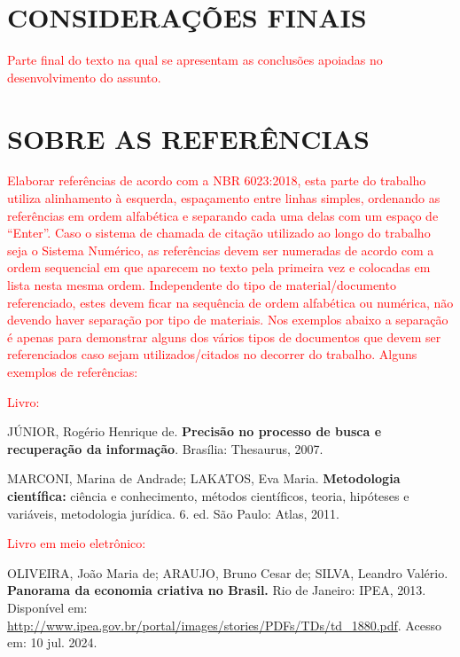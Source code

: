 \documentclass[
	12pt,				%
	openright,			%
	oneside,			%
	a4paper,			%
	english,			%
	french,				%
	spanish,			%
	brazil				%
	]{abntex2UFMT}
\begin{document}
\chapter{CONSIDERAÇÕES FINAIS}\label{CONSIDERAÇÕES}
\textcolor{red}{Parte final do texto na qual se apresentam as conclusões apoiadas no desenvolvimento do assunto.
}

\chapter{SOBRE AS REFERÊNCIAS}\label{SOBRE}
\textcolor{red}{Elaborar referências de acordo com a NBR 6023:2018, esta parte do trabalho utiliza
alinhamento à esquerda, espaçamento entre linhas simples, ordenando as referências em
ordem alfabética e separando cada uma delas com um espaço de “Enter”. Caso o sistema de
chamada de citação utilizado ao longo do trabalho seja o Sistema Numérico, as referências
devem ser numeradas de acordo com a ordem sequencial em que aparecem no texto pela
primeira vez e colocadas em lista nesta mesma ordem.
Independente do tipo de material/documento referenciado, estes devem ficar na
sequência de ordem alfabética ou numérica, não devendo haver separação por tipo de
materiais. Nos exemplos abaixo a separação é apenas para demonstrar alguns dos vários tipos
de documentos que devem ser referenciados caso sejam utilizados/citados no decorrer do
trabalho.
Alguns exemplos de referências:}

\textcolor{red}{Livro:}
\begin{flushleft}
\begin{SingleSpace}
JÚNIOR, Rogério Henrique de. \textbf{Precisão no processo de busca e recuperação da informação}. Brasília: Thesaurus, 2007.
\end{SingleSpace}
\end{flushleft}

\begin{flushleft}
\begin{SingleSpace}
MARCONI, Marina de Andrade; LAKATOS, Eva Maria. \textbf{Metodologia científica:} ciência e conhecimento, métodos científicos, teoria, hipóteses e variáveis, metodologia jurídica. 6. ed. São Paulo: Atlas, 2011.
\end{SingleSpace}
\end{flushleft}

\textcolor{red}{Livro em meio eletrônico:}
\begin{flushleft}
\begin{SingleSpace}
OLIVEIRA, João Maria de; ARAUJO, Bruno Cesar de; SILVA, Leandro Valério. \textbf{Panorama da economia criativa no Brasil.} Rio de Janeiro: IPEA, 2013. Disponível em: \url{http://www.ipea.gov.br/portal/images/stories/PDFs/TDs/td_1880.pdf}. Acesso em: 10 jul. 2024.
\end{SingleSpace}
\end{flushleft}
\end{document}
